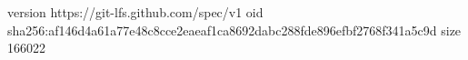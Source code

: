 version https://git-lfs.github.com/spec/v1
oid sha256:af146d4a61a77e48c8cce2eaeaf1ca8692dabc288fde896efbf2768f341a5c9d
size 166022
